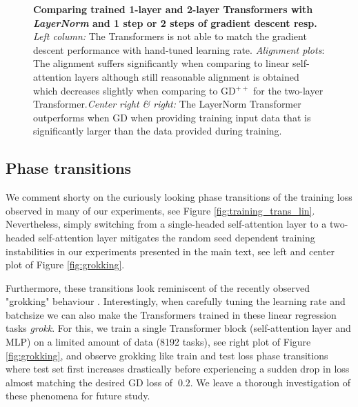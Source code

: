 \documentclass{article}
\theoremstyle{plain}
\theoremstyle{definition}
\theoremstyle{remark}
\begin{document}
\begin{figure}
\begin{center}
\begin{minipage}{.24\textwidth}
\begin{center}
  \end{center}
  \vspace{-10pt}
\end{minipage}
\end{center}
\vspace{-3pt}
  \caption{\textbf{Comparing trained 1-layer and 2-layer Transformers with  \textit{LayerNorm} and 1 step or 2 steps of gradient descent resp.} \textit{Left column:} The Transformers is not able to match the gradient descent performance with hand-tuned learning rate.  
  \textit{Alignment plots}: The alignment suffers significantly when comparing to linear self-attention layers although still reasonable alignment is obtained which decreases slightly when comparing to GD$^{++}$ for the two-layer Transformer.\textit{Center right \& right:} The LayerNorm Transformer outperforms when GD when providing training input data that is significantly larger than the data provided during training.}
  \label{fig:layernorm}
  \vspace{-10pt}
\end{figure}

\subsection{Phase transitions}
\label{app:phase_transitions}

We comment shorty on the curiously looking phase transitions of the training loss observed in many of our experiments, see Figure \ref{fig:training_trans_lin}. Nevertheless, simply switching from a single-headed self-attention layer to a two-headed self-attention layer mitigates the random seed dependent training instabilities in our experiments presented in the main text, see left and center plot of Figure \ref{fig:grokking}.

Furthermore, these transitions look reminiscent of the recently observed "grokking" behaviour \cite{grocking}. Interestingly, when carefully tuning the learning rate and batchsize we can also make the Transformers trained in these linear regression tasks \textit{grokk}. For this, we train a single Transformer block (self-attention layer and MLP) on a limited amount of data (8192 tasks), see right plot of Figure \ref{fig:grokking}, and observe grokking like train and test loss phase transitions where test set first increases drastically before experiencing a sudden drop in loss almost matching the desired GD loss of $~0.2$. We leave a thorough investigation of these phenomena for future study. 
\end{document}
